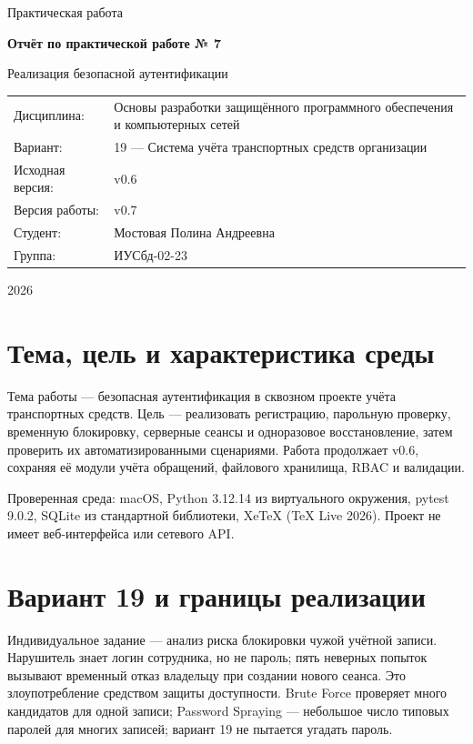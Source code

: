 \documentclass[12pt,a4paper]{article}
\begin{document}
\begin{titlepage}
\centering
{\large Практическая работа\par}
\vspace{2.2cm}
{\LARGE\bfseries Отчёт по практической работе № 7\par}
\vspace{0.6cm}
{\Large Реализация безопасной аутентификации\par}
\vspace{1.8cm}
\begin{tabular}{p{4cm}p{11cm}}
Дисциплина: & Основы разработки защищённого программного обеспечения и компьютерных сетей\\
Вариант: & 19 — Система учёта транспортных средств организации\\
Исходная версия: & v0.6\\
Версия работы: & v0.7\\
Студент: & Мостовая Полина Андреевна\\
Группа: & ИУСбд-02-23
\end{tabular}
\vfill
{\large 2026\par}
\end{titlepage}
\tableofcontents
\clearpage

\section{Тема, цель и характеристика среды}
Тема работы — безопасная аутентификация в сквозном проекте учёта транспортных средств. Цель — реализовать регистрацию, парольную проверку, временную блокировку, серверные сеансы и одноразовое восстановление, затем проверить их автоматизированными сценариями. Работа продолжает v0.6, сохраняя её модули учёта обращений, файлового хранилища, RBAC и валидации.

Проверенная среда: macOS, Python 3.12.14 из виртуального окружения, pytest 9.0.2, SQLite из стандартной библиотеки, XeTeX (TeX Live 2026). Проект не имеет веб-интерфейса или сетевого API.

\section{Вариант 19 и границы реализации}
Индивидуальное задание — анализ риска блокировки чужой учётной записи. Нарушитель знает логин сотрудника, но не пароль; пять неверных попыток вызывают временный отказ владельцу при создании нового сеанса. Это злоупотребление средством защиты доступности. Brute Force проверяет много кандидатов для одной записи; Password Spraying — небольшое число типовых паролей для многих записей; вариант 19 не пытается угадать пароль.
\end{document}

